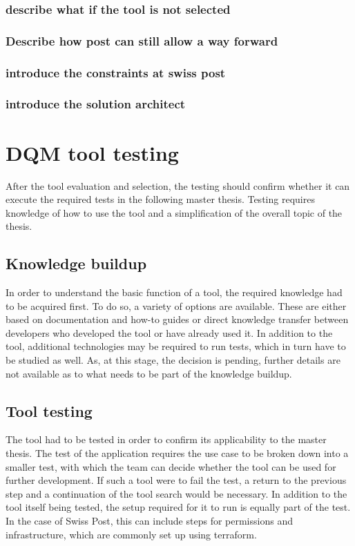 \subsubsection{describe what if the tool is not selected
}\subsubsection{Describe how post can still allow a way forward
}\subsubsection{introduce the constraints at swiss post
}\subsubsection{introduce the solution architect}



\section{DQM tool testing}

After the tool evaluation and selection, the testing should confirm whether it can execute the required tests in the following master thesis. Testing requires knowledge of how to use the tool and a simplification of the overall topic of the thesis.




\subsection*{Knowledge buildup}

In order to understand the basic function of a tool, the required knowledge had to be acquired first. To do so, a variety of options are available. These are either based on documentation and how-to guides or direct knowledge transfer between developers who developed the tool or have already used it. In addition to the tool, additional technologies may be required to run tests, which in turn have to be studied as well. As, at this stage, the decision is pending, further details are not available as to what needs to be part of the knowledge buildup.

\subsection*{Tool testing}

The tool had to be tested in order to confirm its applicability to the master thesis. The test of the application requires the use case to be broken down into a smaller test, with which the team can decide whether the tool can be used for further development. If such a tool were to fail the test, a return to the previous step and a continuation of the tool search would be necessary. In addition to the tool itself being tested, the setup required for it to run is equally part of the test. In the case of Swiss Post, this can include steps for permissions and infrastructure, which are commonly set up using \gls{terraform}.



